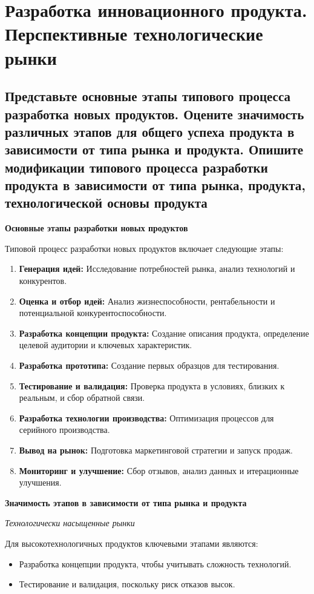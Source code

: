\section{Разработка инновационного продукта. Перспективные технологические рынки}

\subsection{Представьте основные этапы типового процесса разработка новых продуктов. Оцените значимость различных этапов для общего успеха продукта в зависимости от типа рынка и продукта. Опишите модификации типового процесса разработки продукта в зависимости от типа рынка, продукта, технологической основы продукта}

\textbf{Основные этапы разработки новых продуктов}

Типовой процесс разработки новых продуктов включает следующие этапы:

\begin{enumerate}
    \item \textbf{Генерация идей:} Исследование потребностей рынка, анализ технологий и конкурентов.
    \item \textbf{Оценка и отбор идей:} Анализ жизнеспособности, рентабельности и потенциальной конкурентоспособности.
    \item \textbf{Разработка концепции продукта:} Создание описания продукта, определение целевой аудитории и ключевых характеристик.
    \item \textbf{Разработка прототипа:} Создание первых образцов для тестирования.
    \item \textbf{Тестирование и валидация:} Проверка продукта в условиях, близких к реальным, и сбор обратной связи.
    \item \textbf{Разработка технологии производства:} Оптимизация процессов для серийного производства.
    \item \textbf{Вывод на рынок:} Подготовка маркетинговой стратегии и запуск продаж.
    \item \textbf{Мониторинг и улучшение:} Сбор отзывов, анализ данных и итерационные улучшения.
\end{enumerate}

\textbf{Значимость этапов в зависимости от типа рынка и продукта}

\textit{Технологически насыщенные рынки}

Для высокотехнологичных продуктов ключевыми этапами являются:
\begin{itemize}
    \item Разработка концепции продукта, чтобы учитывать сложность технологий.
    \item Тестирование и валидация, поскольку риск отказов высок.
\end{itemize}

